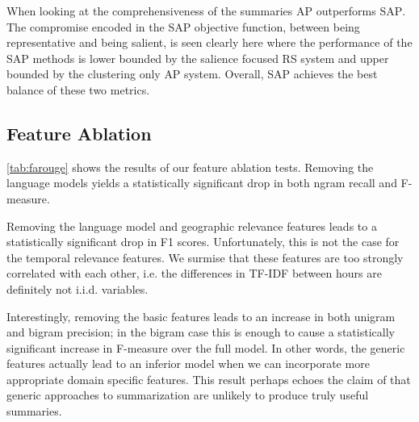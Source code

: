 When looking at the comprehensiveness of the summaries \textsc{AP} outperforms
\textsc{SAP}. The compromise encoded in the \textsc{SAP} objective function,
between being representative and being salient, is seen clearly here where the
performance of the \textsc{SAP} methods is lower bounded by the salience
focused \textsc{RS} system and upper bounded by the clustering only \textsc{AP}
system. Overall, \textsc{SAP} achieves the best balance of these two metrics.

\subsection{Feature Ablation}


\autoref{tab:farouge} shows the results of our feature ablation tests.
Removing the language models yields a statistically significant drop in both
ngram recall and F-measure. 

Removing the language model and geographic relevance features leads to a
statistically significant drop in  F1 scores. Unfortunately, this is
not the case for the temporal relevance features. We surmise that these
features are too strongly correlated with each other, i.e. the differences in
TF-IDF between hours are definitely not i.i.d.  variables. 

Interestingly, removing the basic features leads to an increase in both unigram
and bigram precision; in the bigram case this is enough to cause a
statistically significant increase in F-measure over the full model. In other
words, the generic features actually lead to an inferior model when we can
incorporate more appropriate domain specific features.  This result perhaps
echoes the claim of \cite{jones1999} that generic approaches to summarization
are unlikely to produce truly useful summaries.
